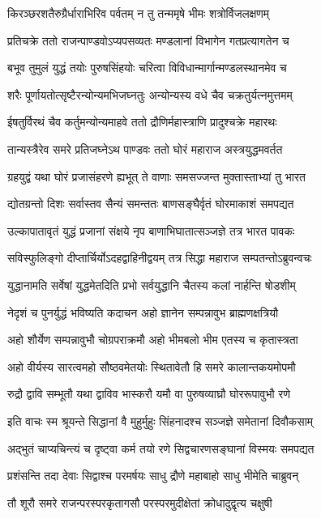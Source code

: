 \twolineshloka
{किरञ्छरशतैरुग्रैर्धाराभिरिव पर्वतम्}
{न तु तन्ममृषे भीमः शत्रोर्विजलक्षणम्}


\twolineshloka
{प्रतिचक्रे ततो राजन्पाण्डवोऽप्यपसव्यतः}
{मण्डलानां विभागेन गतप्रत्यागतेन च}


\twolineshloka
{बभूव तुमुलं युद्धं तयोः पुरुषसिंहयोः}
{चरित्वा विविधान्मार्गान्मण्डलस्थानमेव च}


\twolineshloka
{शरैः पूर्णायतोत्सृष्टैरन्योन्यमभिजघ्नतुः}
{अन्योन्यस्य वधे चैव चक्रतुर्यत्नमुत्तमम्}


\twolineshloka
{ईषतुर्विरथं चैव कर्तुमन्योन्यमाहवे}
{ततो द्रौणिर्महास्त्राणि प्रादुश्चक्रे महारथः}


\twolineshloka
{तान्यस्त्रैरेव समरे प्रतिजघ्नेऽथ पाण्डवः}
{ततो घोरं महाराज अस्त्रयुद्धमवर्तत}


\twolineshloka
{ग्रहयुद्वं यथा घोरं प्रजासंहरणे ह्यभूत्}
{ते वाणाः समसज्जन्त मुक्तास्ताभ्यां तु भारत}


\twolineshloka
{द्योतग्रन्तो दिशः सर्वास्तव सैन्यं समन्ततः}
{बाणसङ्घैर्वृतं घोरमाकाशं समपद्यत}


\twolineshloka
{उल्कापातावृतं युद्धं प्रजानां संक्षये नृप}
{बाणाभिघातात्सञ्जज्ञे तत्र भारत पावकः}


\twolineshloka
{सविस्फुलिङ्गो दीप्तार्चिर्योऽदहद्वाहिनीद्वयम्}
{तत्र सिद्धा महाराज सम्पतन्तोऽब्रुवन्वचः}


\twolineshloka
{युद्धानामति सर्वेषां युद्धमेतदिति प्रभो}
{सर्वयुद्धानि चैतस्य कलां नार्हन्ति षोडशीम्}


\twolineshloka
{नेदृशं च पुनर्युद्धं भविष्यति कदाचन}
{अहो ज्ञानेन सम्पन्नावुभ ब्राह्मणक्षत्रियौ}


\twolineshloka
{अहो शौर्येण सम्पन्नावुभौ चोग्रपराक्रमौ}
{अहो भीमबलो भीम एतस्य च कृतास्त्रता}


\twolineshloka
{अहो वीर्यस्य सारत्वमहो सौष्ठवमेतयोः}
{स्थितावेतौ हि समरे कालान्तकयमोपमौ}


\twolineshloka
{रुद्रौ द्वावि सम्भूतौ यथा द्वाविव भास्करौ}
{यमौ वा पुरुषव्याघ्रौ घोररूपावुभौ रणे}


\twolineshloka
{इति वाचः स्म श्रूयन्ते सिद्धानां वै मुहुर्मुहुः}
{सिंहनादश्च सञ्जज्ञे समेतानां दिवौकसाम्}


\twolineshloka
{अद्भुतं चाप्यचिन्त्यं च दृष्ट्वा कर्म तयो रणे}
{सिद्वचारणसङ्घानां विस्मयः समपद्यत}


\twolineshloka
{प्रशंसन्ति तदा देवाः सिद्वाश्च परमर्षयः}
{साधु द्रौणे महाबाहो साधु भीमेति चाब्रुवन्}


\twolineshloka
{तौ शूरौ समरे राजन्परस्परकृतागसौ}
{परस्परमुदीक्षेतां क्रोधादुद्वृत्य चक्षुषी}


